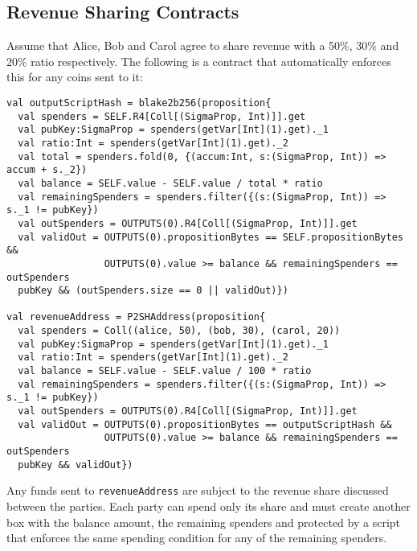 \documentclass[11pt]{article}
\begin{document}
\subsection{Revenue Sharing Contracts}

Assume that Alice, Bob and Carol agree to share revenue with a 50\%, 30\% and 20\% ratio respectively. The following is a contract that automatically enforces this for any coins sent to it:


\begin{verbatim}
val outputScriptHash = blake2b256(proposition{
  val spenders = SELF.R4[Coll[(SigmaProp, Int)]].get
  val pubKey:SigmaProp = spenders(getVar[Int](1).get)._1
  val ratio:Int = spenders(getVar[Int](1).get)._2
  val total = spenders.fold(0, {(accum:Int, s:(SigmaProp, Int)) => accum + s._2})
  val balance = SELF.value - SELF.value / total * ratio
  val remainingSpenders = spenders.filter({(s:(SigmaProp, Int)) => s._1 != pubKey})
  val outSpenders = OUTPUTS(0).R4[Coll[(SigmaProp, Int)]].get
  val validOut = OUTPUTS(0).propositionBytes == SELF.propositionBytes &&
                 OUTPUTS(0).value >= balance && remainingSpenders == outSpenders
  pubKey && (outSpenders.size == 0 || validOut)})

val revenueAddress = P2SHAddress(proposition{
  val spenders = Coll((alice, 50), (bob, 30), (carol, 20))
  val pubKey:SigmaProp = spenders(getVar[Int](1).get)._1
  val ratio:Int = spenders(getVar[Int](1).get)._2
  val balance = SELF.value - SELF.value / 100 * ratio
  val remainingSpenders = spenders.filter({(s:(SigmaProp, Int)) => s._1 != pubKey})
  val outSpenders = OUTPUTS(0).R4[Coll[(SigmaProp, Int)]].get
  val validOut = OUTPUTS(0).propositionBytes == outputScriptHash &&
                 OUTPUTS(0).value >= balance && remainingSpenders == outSpenders
  pubKey && validOut})
\end{verbatim}

Any funds sent to \texttt{revenueAddress} are subject to the revenue share discussed between the parties. 
Each party can spend only its share and must create another box with the balance amount, the remaining spenders and protected by a script that enforces the same spending condition for any of the remaining spenders.
\end{document}
